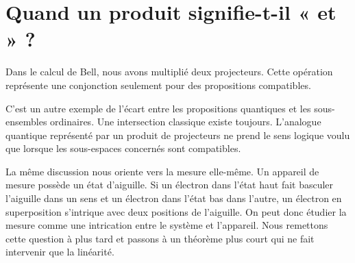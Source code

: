 \section{Quand un produit signifie-t-il « et » ?}

Dans le calcul de Bell, nous avons multiplié deux projecteurs. Cette opération représente une conjonction seulement pour des propositions compatibles.

\begin{classroomqa}
\end{classroomqa}

C’est un autre exemple de l’écart entre les propositions quantiques et les sous-ensembles ordinaires. Une intersection classique existe toujours. L’analogue quantique représenté par un produit de projecteurs ne prend le sens logique voulu que lorsque les sous-espaces concernés sont compatibles.

La même discussion nous oriente vers la mesure elle-même. Un appareil de mesure possède un état d’aiguille. Si un électron dans l’état haut fait basculer l’aiguille dans un sens et un électron dans l’état bas dans l’autre, un électron en superposition s’intrique avec deux positions de l’aiguille. On peut donc étudier la mesure comme une intrication entre le système et l’appareil. Nous remettons cette question à plus tard et passons à un théorème plus court qui ne fait intervenir que la linéarité.

\begin{classroomqa}
\end{classroomqa}

